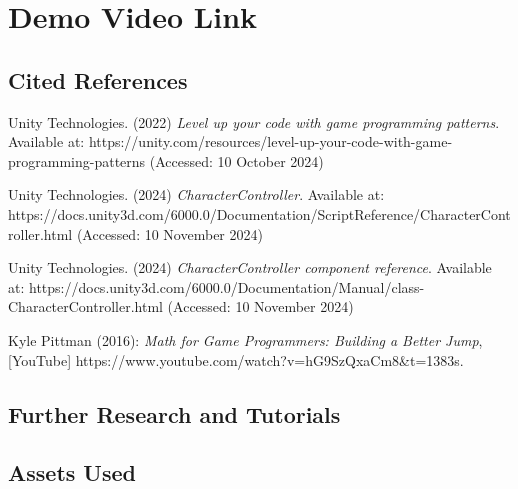 \documentclass[]{final_report}
\begin{document}
\section{Demo Video Link}

\newpage
\begin{thebibliography}{99}
\subsection{Cited References}
\item Unity Technologies. (2022) \textit{Level up your code with game programming patterns}. Available at: https://unity.com/resources/level-up-your-code-with-game-programming-patterns (Accessed: 10 October 2024)
\item Unity Technologies. (2024) \textit{CharacterController}. Available at: https://docs.unity3d.com/6000.0/Documentation/ScriptReference/CharacterController.html (Accessed: 10 November 2024)
\item Unity Technologies. (2024) \textit{CharacterController component reference}. Available at: https://docs.unity3d.com/6000.0/Documentation/Manual/class-CharacterController.html (Accessed: 10 November 2024)
\item Kyle Pittman (2016): \textit{Math for Game Programmers: Building a Better Jump}, [YouTube] https://www.youtube.com/watch?v=hG9SzQxaCm8\&t=1383s.
\subsection{Further Research and Tutorials}
\subsection{Assets Used}
\end{thebibliography}
\label{endpage}
\end{document}
